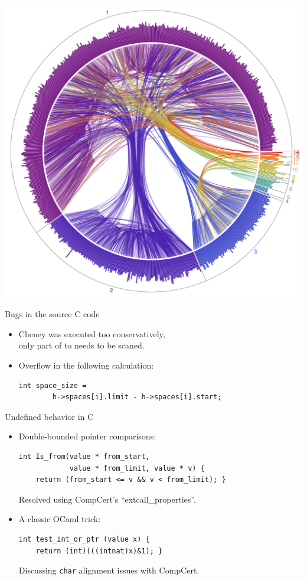 \documentclass[professionalfonts, xcolor=table]{beamer}
\begin{document}
\begin{frame}
  \centering
  \includegraphics[height=\textheight]{certigc_theorems.pdf}
\end{frame}

\begin{frame}[fragile]{Bugs in the source C code}
  \begin{itemize}
  \item Cheney was executed too conservatively,\\ only part of
    \textsf{to} needs to be scaned.
  \pause
\item Overflow in the following calculation:\\
\begin{verbatim}
int space_size = 
        h->spaces[i].limit - h->spaces[i].start;  
\end{verbatim}
  \end{itemize}
\end{frame}

\begin{frame}[fragile]{Undefined behavior in C}
  
  \begin{itemize}
  \item Double-bounded pointer comparisons:
    \begin{Verbatim}
int Is_from(value * from_start,
            value * from_limit, value * v) {
    return (from_start <= v && v < from_limit); }
    \end{Verbatim}
    Resolved using CompCert's ``extcall\_properties''.
    \pause
  \item A classic OCaml trick:
    \begin{Verbatim}
int test_int_or_ptr (value x) {
    return (int)(((intnat)x)&1); }
    \end{Verbatim}
    Discussing \texttt{char} alignment issues with CompCert.
  \end{itemize}
\end{frame}
\end{document}
